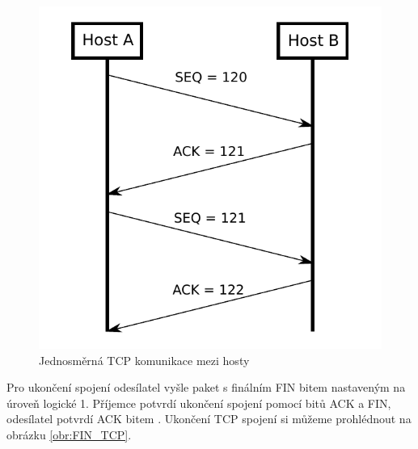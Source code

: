     \begin{figure}[!h]
      \begin{center}
        \includegraphics[scale=0.7]{obrazky/prace/TCP_komunikace.pdf}
      \end{center}
      \caption[TCP komunikace]{Jednosměrná TCP komunikace mezi hosty \cite{Jerabek2013}}
      \label{obr:TCP}
    \end{figure}
    
\par Pro ukončení spojení odesílatel vyšle paket s finálním FIN bitem nastaveným na úroveň logické 1. Příjemce potvrdí ukončení spojení pomocí bitů ACK a FIN, odesílatel potvrdí ACK bitem \cite{Foxc2022}. Ukončení TCP spojení si můžeme prohlédnout na obrázku \ref{obr:FIN_TCP}.

